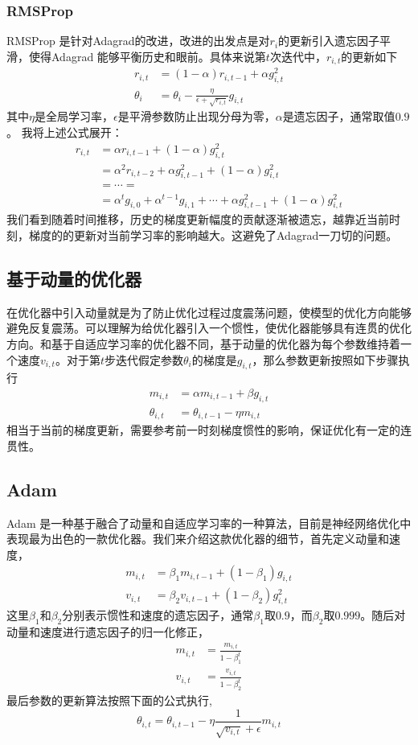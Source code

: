 \documentclass[twoside,a4paper,12pt]{book}%
\begin{document}
\subsubsection{RMSProp}
RMSProp 是针对Adagrad的改进，改进的出发点是对$r_i$的更新引入遗忘因子平滑，使得Adagrad 能够平衡历史和眼前。具体来说第$t$次迭代中，$r_{i,t}$的更新如下
$$
\begin{aligned}
r_{i,t}&=(1-\alpha)r_{i,t-1}+\alpha g_{i,t}^2\\
\theta_i &= \theta_i-\frac{\eta}{\epsilon + \sqrt{r_{i,t}}}g_{i,t}
\end{aligned}
$$
其中$\eta$是全局学习率，$\epsilon$是平滑参数防止出现分母为零，$\alpha$是遗忘因子，通常取值$0.9$。
我将上述公式展开：
$$
\begin{aligned}
r_{i,t}&=\alpha r_{i,t-1}+(1-\alpha) g_{i,t}^2\\
       &=\alpha^2r_{i,t-2}+\alpha g_{i,t-1}^2+(1-\alpha) g_{i,t}^2 \\
       &=\cdots=\\
       &=\alpha^t g_{i,0} +  \alpha^{t-1} g_{i,1} + \cdots + \alpha g_{i,t-1}^2+(1-\alpha) g_{i,t}^2
\end{aligned}
$$
我们看到随着时间推移，历史的梯度更新幅度的贡献逐渐被遗忘，越靠近当前时刻，梯度的的更新对当前学习率的影响越大。这避免了Adagrad一刀切的问题。

\subsection{基于动量的优化器}
在优化器中引入动量就是为了防止优化过程过度震荡问题，使模型的优化方向能够避免反复震荡。可以理解为给优化器引入一个惯性，使优化器能够具有连贯的优化方向。和基于自适应学习率的优化器不同，基于动量的优化器为每个参数维持着一个速度$v_{i,t}$。对于第$t$步迭代假定参数$\theta_i$的梯度是$g_{i,t}$，那么参数更新按照如下步骤执行
$$
\begin{aligned}
m_{i,t}&=\alpha m_{i,t-1} + \beta g_{i,t} \\
\theta_{i,t} &= \theta_{i,t-1} - \eta m_{i,t}
\end{aligned}
$$
相当于当前的梯度更新，需要参考前一时刻梯度惯性的影响，保证优化有一定的连贯性。
\subsection{Adam}
Adam 是一种基于融合了动量和自适应学习率的一种算法，目前是神经网络优化中表现最为出色的一款优化器。我们来介绍这款优化器的细节，首先定义动量和速度，
$$
\begin{aligned}
m_{i,t}&=\beta_1 m_{i,t-1} +(1-\beta_1)g_{i,t} \\
v_{i,t}&=\beta_2 v_{i,t-1} +(1-\beta_2)g_{i,t}^2
\end{aligned}
$$
这里$\beta_1$和$\beta_2$分别表示惯性和速度的遗忘因子，通常$\beta_1$取$0.9$，而$\beta_2$取$0.999$。随后对动量和速度进行遗忘因子的归一化修正，
$$
\begin{aligned}
m_{i,t}&=\frac{m_{i,t}}{1-\beta_1^t} \\
v_{i,t}&=\frac{v_{i,t}}{1-\beta_2^t}
\end{aligned}
$$
最后参数的更新算法按照下面的公式执行,
$$
\theta_{i,t}  =\theta_{i,t-1} -\eta \frac{1}{\sqrt{v_{i,t}}+\epsilon  } m_{i,t} 
$$
\end{document}
